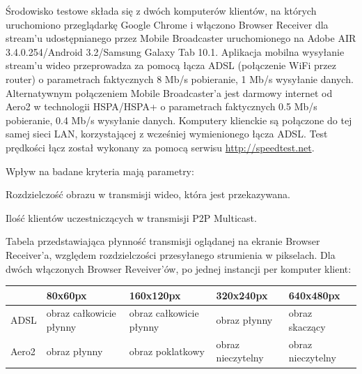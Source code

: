 Środowisko testowe składa się z dwóch komputerów klientów, na których uruchomiono przeglądarkę Google Chrome i włączono Browser Receiver dla stream'u udostępnianego przez Mobile Broadcaster uruchomionego na Adobe AIR 3.4.0.254/Android 3.2/Samsung Galaxy Tab 10.1. Aplikacja mobilna wysyłanie stream'u wideo przeprowadza za pomocą łącza ADSL (połączenie WiFi przez router) o parametrach faktycznych 8 Mb/s pobieranie, 1 Mb/s wysyłanie danych. Alternatywnym połączeniem Mobile Broadcaster'a jest darmowy internet od Aero2 w technologii HSPA/HSPA+ o parametrach faktycznych 0.5 Mb/s pobieranie, 0.4 Mb/s wysyłanie danych. Komputery klienckie są połączone do tej samej sieci LAN, korzystającej z wcześniej wymienionego łącza ADSL. Test prędkości łącz został wykonany za pomocą serwisu \url{http://speedtest.net}.

Wpływ na badane kryteria mają parametry:
\begin{packed_item}
    \item{Rozdzielczość obrazu w transmisji wideo, która jest przekazywana.}
    \item{Ilość klientów uczestniczących w transmisji P2P Multicast.}
\end{packed_item}

Tabela przedstawiająca płynność transmisji oglądanej na ekranie Browser Receiver'a, względem rozdzielczości przesyłanego strumienia w pikselach. Dla dwóch włączonych Browser Reveiver'ów, po jednej instancji per komputer klient:
\begin{table}[h]
    \centering
    \begin{tabular}{|l|l|l|l|l|}
        \hline
        & 80x60px & 160x120px & 320x240px & 640x480px \\
        \hline
        ADSL
        &
        obraz całkowicie płynny 
        &
        obraz całkowicie płynny
        &
        obraz płynny
        &
        obraz skaczący
        \\
        \hline
        Aero2
        &
        obraz płynny
        &
        obraz poklatkowy
        &
        obraz nieczytelny
        &
        obraz nieczytelny
        \\
        \hline
    \end{tabular}
\end{table}


